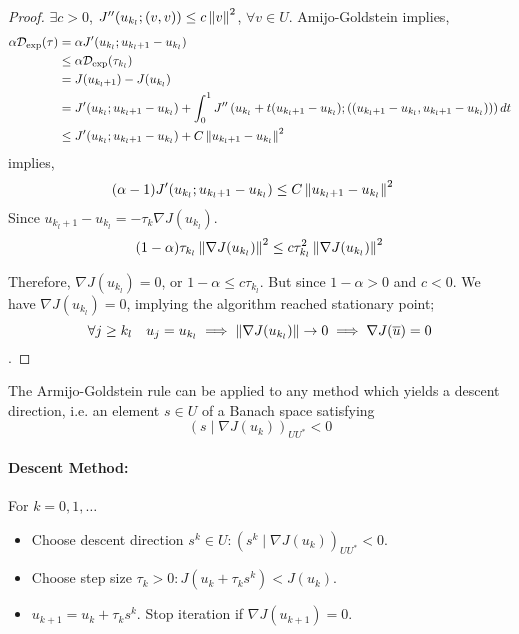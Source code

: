 \begin{theorem}
\begin{proof}
	$\exists c >0$, $J''(u_{k_l};(v,v))\leq c \left\lVert v\right\rVert^2$, $\forall v \in U$. 	Amijo-Goldstein implies,
	\begin{align*}
		\alpha \mathcal{D}_{\text{exp}} (\tau) &= \alpha J'(u_{k_l};u_{{k_l}+1}-u_{{k_l}})\\ &\leq \alpha \mathcal{D}_{\text{exp}}(\tau_{k_l})\\&= J(u_{k_l+1})-J(u_{k_l}) \\
		&= J'(u_{k_l};u_{k_l+1}-u_{k_l}) + \int_{0}^{1} J''\left(u_{k_l}+t(u_{k_l+1}-u_{k_l}); \left((u_{k_l+1}-u_{k_l}, u_{k_l+1}-u_{k_l})\right)\right) dt \\
		& \leq J'(u_{k_l};u_{k_l+1}-u_{k_l}) + C \left\lVert u_{k_l+1}-u_{k_l}\right\rVert^2
		\end{align*}
	implies,
	\begin{align*}
	(\alpha -1) J'(u_{k_l};u_{k_l+1}-u_{k_l}) &\leq C \left\lVert u_{k_l+1}-u_{k_l}\right\rVert^2 
	\end{align*}
	Since $u_{k_l+1}-u_{k_l}= -\tau_k \nabla J(u_{k_l})$.
	\begin{align*}
		(1-\alpha) \tau_{k_l} \left\lVert\nabla J(u_{k_l})\right\rVert^2 \leq c \tau_{k_l}^2\left\lVert\nabla J(u_{k_l})\right\rVert^2
	\end{align*}
	
	Therefore, $\nabla J(u_{k_l})=0$, or $ 1-\alpha \leq c \tau_{k_l}$. But since $1-\alpha > 0$ and $c <0$. 
	We have $\nabla J(u_{k_l}) =0$, implying the algorithm reached stationary point; 
		\[\forall j \geq k_l \quad u_j= u_{k_l}  \implies \left\lVert\nabla J(u_{k_l})\right\rVert \rightarrow 0 \implies \nabla J(\overline{u})=0\].
	\end{proof}
\end{theorem}

\begin{remark}
	The Armijo-Goldstein rule can be applied to any method which yields a descent direction, i.e. an element $s\in U$ of a Banach space satisfying
	\[
		\left(s \mid \nabla J(u_k)\right)_{UU^*} < 0
	\]
	\paragraph{Descent Method:} For $k=0,1,\dots$
		\begin{itemize}
			\item Choose descent direction $s^k \in U: (s^k \mid \nabla J(u_k))_{UU^*}<0$.
			\item Choose step size $\tau_k >0 : J(u_k+\tau_k s^k) < J(u_k)$.
			\item $u_{k+1}=u_k+\tau_k s^k$.
		Stop iteration if $\nabla J(u_{k+1})=0$.
		\end{itemize}
\end{remark}
